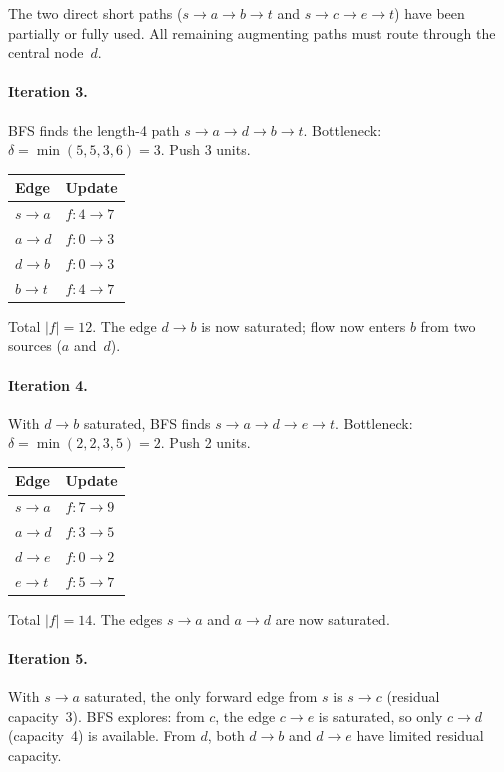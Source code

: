\documentclass[11pt]{article}
\begin{document}
The two direct short paths ($s \to a \to b \to t$ and
$s \to c \to e \to t$) have been partially or fully used.
All remaining augmenting paths must route through the central
node~$d$.

\paragraph{Iteration 3.}
BFS finds the length-4 path $s \to a \to d \to b \to t$.
Bottleneck: $\delta = \min(5, 5, 3, 6) = 3$.  Push 3 units.

\medskip
\begin{center}
\renewcommand{\arraystretch}{1.2}
\begin{tabular}{ll}
  \textbf{Edge} & \textbf{Update} \\
  \hline
  $s \to a$ & $f : 4 \to 7$ \\
  $a \to d$ & $f : 0 \to 3$ \\
  $d \to b$ & $f : 0 \to 3$ \\
  $b \to t$ & $f : 4 \to 7$ \\
\end{tabular}
\end{center}

\medskip
Total $|f| = 12$.  The edge $d \to b$ is now saturated; flow
now enters $b$ from two sources ($a$ and~$d$).

\paragraph{Iteration 4.}
With $d \to b$ saturated, BFS finds
$s \to a \to d \to e \to t$.
Bottleneck: $\delta = \min(2, 2, 3, 5) = 2$.  Push 2 units.

\medskip
\begin{center}
\renewcommand{\arraystretch}{1.2}
\begin{tabular}{ll}
  \textbf{Edge} & \textbf{Update} \\
  \hline
  $s \to a$ & $f : 7 \to 9$ \\
  $a \to d$ & $f : 3 \to 5$ \\
  $d \to e$ & $f : 0 \to 2$ \\
  $e \to t$ & $f : 5 \to 7$ \\
\end{tabular}
\end{center}

\medskip
Total $|f| = 14$.  The edges $s \to a$ and $a \to d$ are now
saturated.

\paragraph{Iteration 5.}
With $s \to a$ saturated, the only forward edge from $s$ is
$s \to c$ (residual capacity~3).  BFS explores: from $c$, the
edge $c \to e$ is saturated, so only $c \to d$ (capacity~4) is
available.  From $d$, both $d \to b$ and $d \to e$ have limited
residual capacity.
\end{document}
